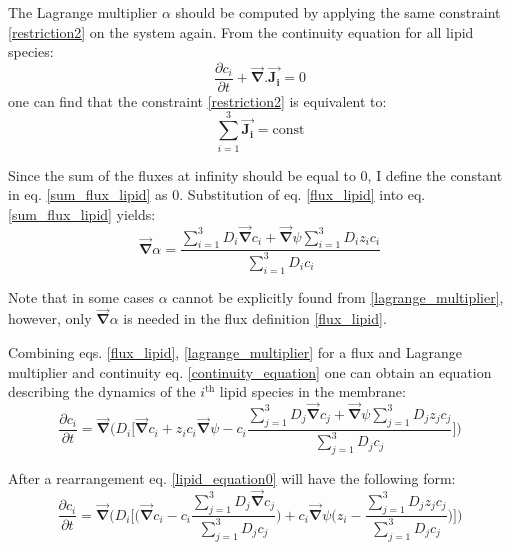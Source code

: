 The Lagrange multiplier $\alpha$ should be computed by applying the same constraint \eqref{restriction2} on the system again. From the continuity equation for all lipid species:
\begin{equation}
 \label{continuity_equation} \frac{\partial c_i}{\partial t} + \vec{\mathbf{\nabla}}. \vec {\mathbf{J_i}} = 0
\end{equation}
one can find that the constraint \eqref{restriction2} is equivalent to:
\begin{equation}
\label{sum_flux_lipid} \sum_{i=1}^3 \vec{\mathbf{J_i}} = \text{const}
\end{equation}

Since the sum of the fluxes at infinity should be equal to 0, I define the constant in eq. \eqref{sum_flux_lipid} as 0. Substitution of eq. \eqref{flux_lipid} into eq. \eqref{sum_flux_lipid} yields:
\begin{equation}
 \label{lagrange_multiplier}\vec{\mathbf{\nabla}} \alpha = \frac{\sum_{i=1}^3 D_i \vec{\mathbf{\nabla}} c_i + \vec{\mathbf{\nabla}} \psi \sum_{i=1}^3 D_i z_i c_i}{\sum_{i=1}^3 D_i c_i}
\end{equation}

Note that in some cases $\alpha$ cannot be explicitly found from \eqref{lagrange_multiplier}, however, only $\vec{\mathbf{\nabla}} \alpha$ is needed in the flux definition \eqref{flux_lipid}.

Combining eqs. \eqref{flux_lipid}, \eqref{lagrange_multiplier} for a flux and Lagrange multiplier and continuity eq. \eqref{continuity_equation} one can obtain an equation describing the dynamics of the $i^{\text{th}}$ lipid species in the membrane: 
\begin{equation}
\label{lipid_equation0}\frac{\partial c_i}{\partial t} = \vec{\mathbf{\nabla}} \Bigg(D_i\Big[\vec{\mathbf{\nabla}} c_i + z_i c_i \vec{\mathbf{\nabla}}\psi - c_i\frac{\sum_{j=1}^3 D_j \vec{\mathbf{\nabla}} c_j + \vec{\mathbf{\nabla}} \psi \sum_{j=1}^3 D_j z_j c_j}{\sum_{j=1}^3 D_j c_j}\Big]\Bigg)
\end{equation}

After a rearrangement eq. \eqref{lipid_equation0} will have the following form:
\begin{equation}
\label{system1}\frac{\partial c_i}{\partial t}=\vec{\mathbf{\nabla}} \Bigg(D_i\Big[\Big(\vec{\mathbf{\nabla}} c_i - c_i\frac{\sum_{j=1}^3 D_j\vec{\mathbf{\nabla}} c_j}{\sum_{j=1}^3 D_j c_j}\Big) + c_i \vec{\mathbf{\nabla}}\psi\Big(z_i - \frac{\sum_{j=1}^3 D_j z_j c_j}{\sum_{j=1}^3 D_j c_j}\Big)\Big]\Bigg)
\end{equation}

